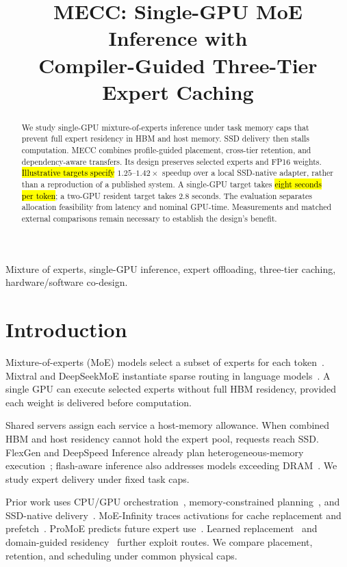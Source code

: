\documentclass[conference,9pt,letterpaper]{IEEEtran}
\title{MECC: Single-GPU MoE Inference with\protect\\Compiler-Guided Three-Tier Expert Caching}
\author{\IEEEauthorblockN{Anonymous Authors}\IEEEauthorblockA{\mbox{}\\\mbox{}}}
\newcommand{\draftnote}[1]{{\sethlcolor{DraftYellow}\hl{#1}}}
\newcommand{\draftvalue}[1]{{\setlength{\fboxsep}{0.4pt}\colorbox{DraftYellow}{#1}}}
\begin{document}
\maketitle
\begin{abstract}
We study single-GPU mixture-of-experts inference under task memory caps that prevent full expert residency in HBM and host memory. SSD delivery then stalls computation. MECC combines profile-guided placement, cross-tier retention, and dependency-aware transfers. Its design preserves selected experts and FP16 weights. \draftnote{Illustrative targets specify} \draftvalue{$1.25$}--\draftvalue{$1.42\times$} speedup over a local SSD-native adapter, rather than a reproduction of a published system. A single-GPU target takes \draftnote{eight seconds per token}; a two-GPU resident target takes \draftvalue{2.8} seconds. The evaluation separates allocation feasibility from latency and nominal GPU-time. Measurements and matched external comparisons remain necessary to establish the design's benefit.
\end{abstract}
\begin{IEEEkeywords}
Mixture of experts, single-GPU inference, expert offloading, three-tier caching, hardware/software co-design.
\end{IEEEkeywords}

\section{Introduction}
Mixture-of-experts (MoE) models select a subset of experts for each token~\cite{shazeer,switch,gshard}. Mixtral and DeepSeekMoE instantiate sparse routing in language models~\cite{mixtral,deepseekmoe}. A single GPU can execute selected experts without full HBM residency, provided each weight is delivered before computation.

Shared servers assign each service a host-memory allowance. When combined HBM and host residency cannot hold the expert pool, requests reach SSD. FlexGen and DeepSpeed Inference already plan heterogeneous-memory execution~\cite{flexgen,dsinference}; flash-aware inference also addresses models exceeding DRAM~\cite{llmflash}. We study expert delivery under fixed task caps.

Prior work uses CPU/GPU orchestration~\cite{fiddler}, memory-constrained planning~\cite{lightning}, and SSD-native delivery~\cite{ssdllama}. MoE-Infinity traces activations for cache replacement and prefetch~\cite{moeinfinity}. ProMoE predicts future expert use~\cite{promoe}. Learned replacement~\cite{flashmoe} and domain-guided residency~\cite{core} further exploit routes. We compare placement, retention, and scheduling under common physical caps.
\end{document}
